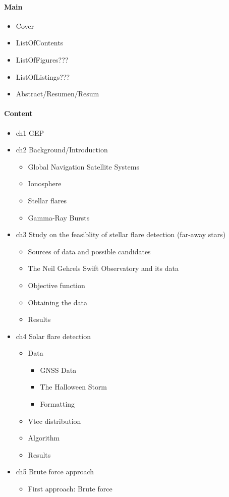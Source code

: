 \paragraph{Main}

\begin{itemize}
	\item Cover
	\item ListOfContents
	\item ListOfFigures???
	\item ListOfListings???
	\item Abstract/Resumen/Resum
\end{itemize} 

\paragraph{Content}

\begin{itemize}
	\item ch1 GEP
	\item ch2 Background/Introduction
	\begin{itemize}
		\item Global Navigation Satellite Systems
		\item Ionosphere
		\item Stellar flares
		\item Gamma-Ray Bursts
	\end{itemize}
	\item ch3 Study on the feasiblity of stellar flare detection (far-away stars)
	\begin{itemize}
		\item Sources of data and possible candidates
		\item The Neil Gehrels Swift Observatory and its data 
		\item Objective function
		\item Obtaining the data
		\item Results
	\end{itemize}
	\item ch4 Solar flare detection
	\begin{itemize}
		\item Data
		\begin{itemize}
			\item GNSS Data
			\item The Halloween Storm
			\item Formatting
		\end{itemize}
		\item Vtec distribution
		\item Algorithm
		\item Results
	\end{itemize}
	\item ch5 Brute force approach
	\begin{itemize}
		\item First approach: Brute force
	\end{itemize}
\end{itemize}

